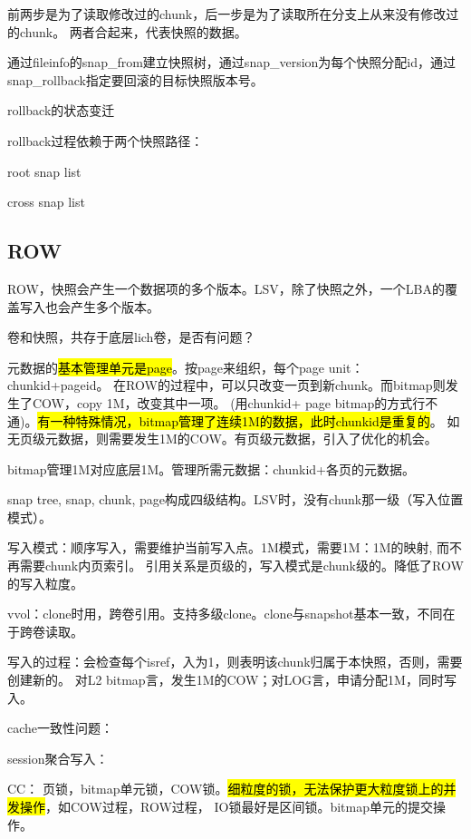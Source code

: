 前两步是为了读取修改过的chunk，后一步是为了读取所在分支上从来没有修改过的chunk。
两者合起来，代表快照的数据。

通过fileinfo的snap\_from建立快照树，通过snap\_version为每个快照分配id，通过snap\_rollback指定要回滚的目标快照版本号。

rollback的状态变迁

rollback过程依赖于两个快照路径：
\begin{compactenum}
\item root snap list
\item cross snap list
\end{compactenum}


\subsection{ROW}


ROW，快照会产生一个数据项的多个版本。LSV，除了快照之外，一个LBA的覆盖写入也会产生多个版本。

卷和快照，共存于底层lich卷，是否有问题？

元数据的\hl{基本管理单元是page}。按page来组织，每个page unit：chunkid+pageid。
在ROW的过程中，可以只改变一页到新chunk。而bitmap则发生了COW，copy 1M，改变其中一项。
(用chunkid+ page bitmap的方式行不通)。\hl{有一种特殊情况，bitmap管理了连续1M的数据，此时chunkid是重复的}。
如无页级元数据，则需要发生1M的COW。有页级元数据，引入了优化的机会。

bitmap管理1M对应底层1M。管理所需元数据：chunkid+各页的元数据。

snap tree, snap, chunk, page构成四级结构。LSV时，没有chunk那一级（写入位置模式）。

写入模式：顺序写入，需要维护当前写入点。1M模式，需要1M：1M的映射, 而不再需要chunk内页索引。
引用关系是页级的，写入模式是chunk级的。降低了ROW的写入粒度。

vvol：clone时用，跨卷引用。支持多级clone。clone与snapshot基本一致，不同在于跨卷读取。

写入的过程：会检查每个isref，入为1，则表明该chunk归属于本快照，否则，需要创建新的。
对L2 bitmap言，发生1M的COW；对LOG言，申请分配1M，同时写入。

cache一致性问题：

session聚合写入：

CC： 页锁，bitmap单元锁，COW锁。\hl{细粒度的锁，无法保护更大粒度锁上的并发操作}，如COW过程，ROW过程，
IO锁最好是区间锁。bitmap单元的提交操作。

